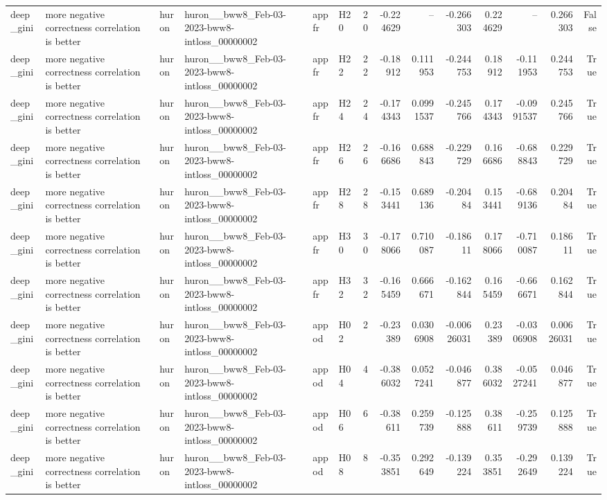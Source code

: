 \begin{longtable}{llllllrrrrrrrr}
deep\_gini & more negative correctness correlation is better & huron & huron\_\_bww8\_Feb-03-2023-bww8-intloss\_00000002 & appfr & H20 & 20 & -0.224629 & -- & -0.266303 & 0.224629 & -- & 0.266303 & False \\
deep\_gini & more negative correctness correlation is better & huron & huron\_\_bww8\_Feb-03-2023-bww8-intloss\_00000002 & appfr & H22 & 22 & -0.18912 & 0.111953 & -0.244753 & 0.18912 & -0.111953 & 0.244753 & True \\
deep\_gini & more negative correctness correlation is better & huron & huron\_\_bww8\_Feb-03-2023-bww8-intloss\_00000002 & appfr & H24 & 24 & -0.174343 & 0.0991537 & -0.245766 & 0.174343 & -0.0991537 & 0.245766 & True \\
deep\_gini & more negative correctness correlation is better & huron & huron\_\_bww8\_Feb-03-2023-bww8-intloss\_00000002 & appfr & H26 & 26 & -0.166686 & 0.688843 & -0.229729 & 0.166686 & -0.688843 & 0.229729 & True \\
deep\_gini & more negative correctness correlation is better & huron & huron\_\_bww8\_Feb-03-2023-bww8-intloss\_00000002 & appfr & H28 & 28 & -0.153441 & 0.689136 & -0.20484 & 0.153441 & -0.689136 & 0.20484 & True \\
deep\_gini & more negative correctness correlation is better & huron & huron\_\_bww8\_Feb-03-2023-bww8-intloss\_00000002 & appfr & H30 & 30 & -0.178066 & 0.710087 & -0.18611 & 0.178066 & -0.710087 & 0.18611 & True \\
deep\_gini & more negative correctness correlation is better & huron & huron\_\_bww8\_Feb-03-2023-bww8-intloss\_00000002 & appfr & H32 & 32 & -0.165459 & 0.666671 & -0.162844 & 0.165459 & -0.666671 & 0.162844 & True \\
deep\_gini & more negative correctness correlation is better & huron & huron\_\_bww8\_Feb-03-2023-bww8-intloss\_00000002 & appod & H02 & 2 & -0.23389 & 0.0306908 & -0.00626031 & 0.23389 & -0.0306908 & 0.00626031 & True \\
deep\_gini & more negative correctness correlation is better & huron & huron\_\_bww8\_Feb-03-2023-bww8-intloss\_00000002 & appod & H04 & 4 & -0.386032 & 0.0527241 & -0.046877 & 0.386032 & -0.0527241 & 0.046877 & True \\
deep\_gini & more negative correctness correlation is better & huron & huron\_\_bww8\_Feb-03-2023-bww8-intloss\_00000002 & appod & H06 & 6 & -0.38611 & 0.259739 & -0.125888 & 0.38611 & -0.259739 & 0.125888 & True \\
deep\_gini & more negative correctness correlation is better & huron & huron\_\_bww8\_Feb-03-2023-bww8-intloss\_00000002 & appod & H08 & 8 & -0.353851 & 0.292649 & -0.139224 & 0.353851 & -0.292649 & 0.139224 & True \\

\end{longtable}
